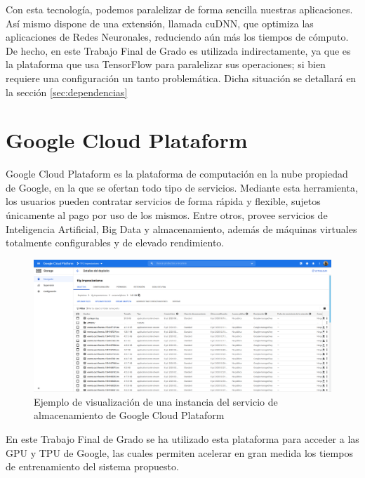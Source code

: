 \documentclass[../main.tex]{subfiles}
\begin{document}
Con esta tecnología, podemos paralelizar de forma sencilla nuestras aplicaciones. Así mismo dispone de una extensión, llamada cuDNN, que optimiza las aplicaciones de Redes Neuronales, reduciendo aún más los tiempos de cómputo. De hecho, en este Trabajo Final de Grado es utilizada indirectamente, ya que es la plataforma que usa TensorFlow para paralelizar sus operaciones; si bien requiere una configuración un tanto problemática. Dicha situación se detallará en la sección \ref{sec:dependencias}

\section{Google Cloud Plataform}

Google Cloud Plataform es la plataforma de computación en la nube propiedad de Google, en la que se ofertan todo tipo de servicios. Mediante esta herramienta, los usuarios pueden contratar servicios de forma rápida y flexible, sujetos únicamente al pago por uso de los mismos. Entre otros, provee servicios de Inteligencia Artificial, Big Data y almacenamiento, además de máquinas virtuales totalmente configurables y de elevado rendimiento. \newline

\begin{figure}[h!]
    \centering
    \includegraphics[width=1\textwidth]{imagenes/gcp_logs.png}
    \caption{Ejemplo de visualización de una instancia del servicio de almacenamiento de Google Cloud Plataform}
    \label{fig:gcp_logs}
\end{figure}

En este Trabajo Final de Grado se ha utilizado esta plataforma para acceder a las GPU y TPU de Google, las cuales permiten acelerar en gran medida los tiempos de entrenamiento del sistema propuesto.
\end{document}
